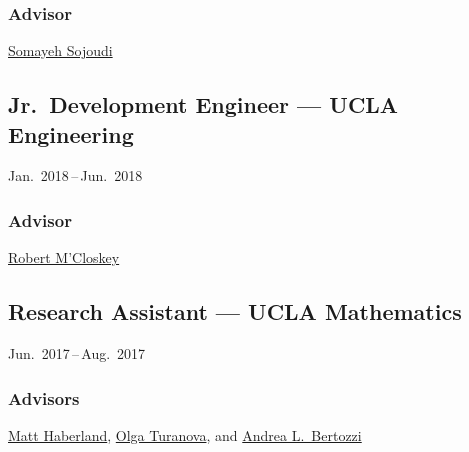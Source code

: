 \documentclass[11pt]{article}
\newcommand{\subsectionskip}{\baselineskip}	%
\newcommand{\cvdates}[2]{\hfill#1\,--\,#2}	%
\begin{document}
	\subsubsection{Advisor}
	\href{https://people.eecs.berkeley.edu/~sojoudi/}{Somayeh Sojoudi}
	
	\vspace*{\subsectionskip}
	
	\subsection{Jr.\ Development Engineer --- UCLA Engineering}
	\cvdates{Jan.\ 2018}{Jun.\ 2018}
	
	\subsubsection{Advisor}
	\href{http://www.seas.ucla.edu/mcloskey/}{Robert M'Closkey}
	
	\vspace*{\subsectionskip}
	
	\subsection{Research Assistant --- UCLA Mathematics}
	\cvdates{Jun.\ 2017}{Aug.\ 2017}
	
	\subsubsection{Advisors}
	\href{https://brae.calpoly.edu/faculty-and-staff-haberland}{Matt Haberland}, \href{https://sites.google.com/msu.edu/turanova/home}{Olga Turanova}, and \href{http://www.math.ucla.edu/~bertozzi/}{Andrea L.\ Bertozzi}

\end{document}
